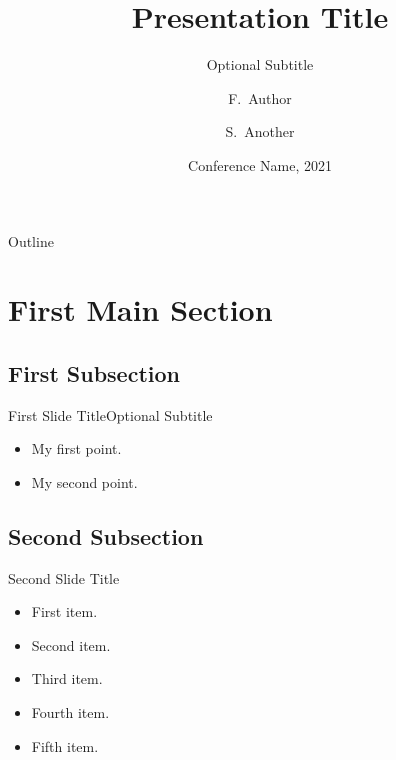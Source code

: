 \documentclass[
  UTF8, %
  aspectratio=43, %
  11pt, %
]{presentation}
\title{Presentation Title}
\subtitle{Optional Subtitle}
\author{F.~Author\inst{1} \and S.~Another\inst{2}}
\institute[Universities of Somewhere and Elsewhere] %
{
  \inst{1}
  Department of Computer Science \\
  University of Somewhere
  \and
  \inst{2}
  Department of Theoretical Philosophy \\
  University of Elsewhere
}
\date{Conference Name, 2021}
\begin{document}
{

  \begin{frame}
    \titlepage
  \end{frame}
}

\begin{frame}{Outline}
  \tableofcontents
\end{frame}


\section{First Main Section}

\subsection{First Subsection}

\begin{frame}{First Slide Title}{Optional Subtitle}
  \begin{itemize}
    \item {
          My first point.
          }
    \item {
          My second point.
          }
  \end{itemize}
\end{frame}

\subsection{Second Subsection}

\begin{frame}{Second Slide Title}
  \begin{itemize}
    \item {
          First item.
          \pause %
          }
    \item {
          Second item.
          }
    \item<3-> {
          Third item.
          }
    \item<4-> {
          Fourth item.
          }
    \item<5-> {
          Fifth item. 
          }
  \end{itemize}
\end{frame}
\end{document}
